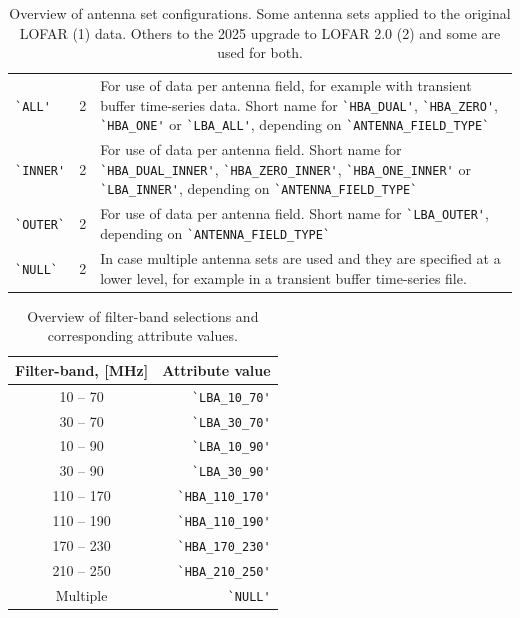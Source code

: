 \begin{table}[ht]
\begin{tabular}{|llp{9cm}|}
    \verb|`ALL'| & 2 & For use of data per antenna field, for example with transient buffer time-series data. Short name for \verb|`HBA_DUAL'|, \verb|`HBA_ZERO'|, \verb|`HBA_ONE'| or \verb|`LBA_ALL'|, depending on \verb|`ANTENNA_FIELD_TYPE`| \\
    \verb|`INNER'| & 2 &  For use of data per antenna field. Short name for \verb|`HBA_DUAL_INNER'|, \verb|`HBA_ZERO_INNER'|, \verb|`HBA_ONE_INNER'| or \verb|`LBA_INNER'|, depending on \verb|`ANTENNA_FIELD_TYPE`| \\
    \verb|`OUTER`| & 2 & For use of data per antenna field. Short name for \verb|`LBA_OUTER'|, depending on \verb|`ANTENNA_FIELD_TYPE`| \\
    \verb|`NULL`| & 2 & In case multiple antenna sets are used and they are specified at a lower level, for example in a transient buffer time-series file. \\
    \hline
  \end{tabular}
  \caption{Overview of antenna set configurations. Some antenna sets applied to the original LOFAR (1) data. Others to the 2025 upgrade to LOFAR 2.0 (2) and some are used for both.}
  \label{tab:antenna-set}
\end{table}

\begin{table}[ht]
  \centering
  \begin{tabular}{|cr|}
    \hline
    \sc Filter-band, [MHz] & \sc Attribute value \\
    \hline \hline
    10 -- 70   & \verb|`LBA_10_70'| \\
    30 -- 70   & \verb|`LBA_30_70'| \\
    10 -- 90   & \verb|`LBA_10_90'| \\
    30 -- 90   & \verb|`LBA_30_90'| \\
    110 -- 170 & \verb|`HBA_110_170'| \\
    110 -- 190 & \verb|`HBA_110_190'| \\
    170 -- 230 & \verb|`HBA_170_230'| \\
    210 -- 250 & \verb|`HBA_210_250'| \\
    Multiple  & \verb|`NULL'| \\
    \hline
  \end{tabular}
  \caption{Overview of filter-band selections and corresponding
    attribute values.}
  \label{tab:filter-selection}
\end{table}



